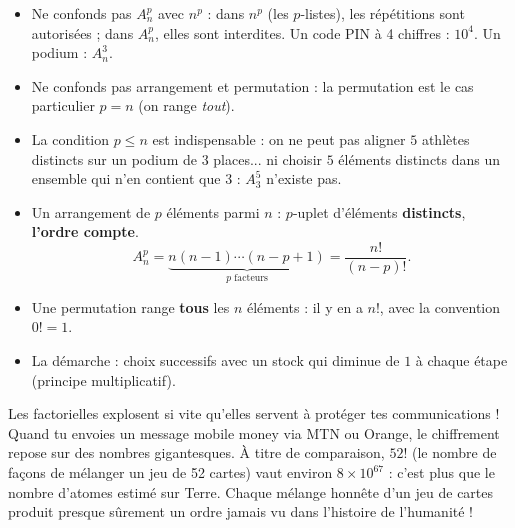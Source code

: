 \documentclass[11pt]{article}
\newcommand{\cle}[1]{{\popxbold\color{popdark}#1}}
\begin{document}
\begin{attention}
\begin{itemize}
\item Ne confonds pas $A_n^p$ avec $n^p$ : dans $n^p$ (les $p$-listes), les répétitions sont autorisées ; dans $A_n^p$, elles sont interdites. Un code PIN à 4 chiffres : $10^4$. Un podium : $A_n^3$.
\item Ne confonds pas arrangement et permutation : la permutation est le cas particulier $p = n$ (on range \emph{tout}).
\item La condition $p \le n$ est indispensable : on ne peut pas aligner $5$ athlètes distincts sur un podium de $3$ places... ni choisir $5$ éléments distincts dans un ensemble qui n'en contient que $3$ : $A_3^5$ n'existe pas.
\end{itemize}
\end{attention}

\begin{aretenir}
\begin{itemize}
\item Un \cle{arrangement} de $p$ éléments parmi $n$ : $p$-uplet d'éléments \textbf{distincts}, \textbf{l'ordre compte}.
\[ A_n^p = \underbrace{n(n-1)\cdots(n-p+1)}_{p \text{ facteurs}} = \frac{n!}{(n-p)!}. \]
\item Une \cle{permutation} range \textbf{tous} les $n$ éléments : il y en a $n!$, avec la convention $0! = 1$.
\item La démarche : choix successifs avec un stock qui diminue de $1$ à chaque étape (principe multiplicatif).
\end{itemize}
\end{aretenir}

\begin{savaistu}
Les factorielles explosent si vite qu'elles servent à protéger tes communications ! Quand tu envoies un message mobile money via MTN ou Orange, le chiffrement repose sur des nombres gigantesques. À titre de comparaison, $52!$ (le nombre de façons de mélanger un jeu de 52 cartes) vaut environ $8 \times 10^{67}$ : c'est plus que le nombre d'atomes estimé sur Terre. Chaque mélange honnête d'un jeu de cartes produit presque sûrement un ordre jamais vu dans l'histoire de l'humanité !
\end{savaistu}
\end{document}
